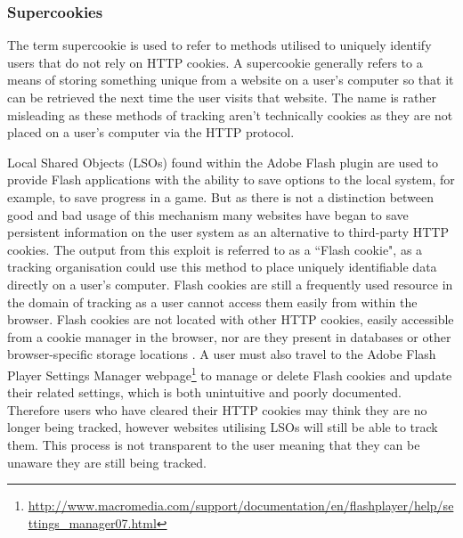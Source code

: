 \documentclass[12pt]{article}
\begin{document}
\subsubsection{Supercookies} \label{Supercookies}
The term supercookie is used to refer to methods utilised to uniquely identify users that do not rely on HTTP cookies. A supercookie generally refers to a means of storing something unique from a website on a user's computer so that it can be retrieved the next time the user visits that website. The name is rather misleading as these methods of tracking aren't technically cookies as they are not placed on a user's computer via the HTTP protocol. \newline 

Local Shared Objects (LSOs) found within the Adobe Flash plugin are used to provide Flash applications with the ability to save options to the local system, for example, to save progress in a game. But as there is not a distinction between good and bad usage of this mechanism many websites have began to save persistent information on the user system as an alternative to third-party HTTP cookies. The output from this exploit is referred to as a ``Flash cookie", as a tracking organisation could use this method to place uniquely identifiable data directly on a user's computer. Flash cookies are still a frequently used resource in the domain of tracking as a user cannot access them easily from within the browser. Flash cookies are not located with other HTTP cookies, easily accessible from a cookie manager in the browser, nor are they present in databases or other browser-specific storage locations \parencite{flashCookies}. A user must also travel to the Adobe Flash Player Settings Manager webpage\footnote{\url{ http://www.macromedia.com/support/documentation/en/flashplayer/help/settings_manager07.html}} to manage or delete Flash cookies and update their related settings, which is both unintuitive and poorly documented. Therefore users who have cleared their HTTP cookies may think they are no longer being tracked, however websites utilising LSOs will still be able to track them. This process is not transparent to the user meaning that they can be unaware they are still being tracked.\\ 
\end{document}
